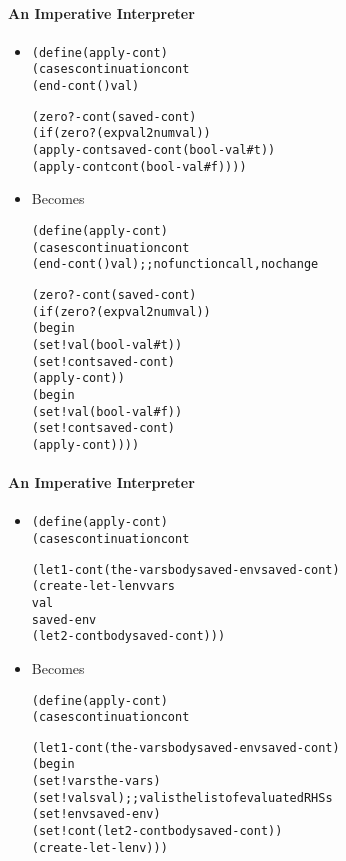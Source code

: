 \documentclass{beamer}
\begin{document}
\begin{frame}[fragile]
\framesubtitle{An Imperative Interpreter}
\begin{scriptsize}
\begin{itemize}
\item<1->
\begin{alltt}
(define (apply-cont)
  (cases continuation cont
    (end-cont () val)

    (zero?-cont (saved-cont)
                (if (zero? (expval2num val))
                    (apply-cont saved-cont (bool-val #t))
                    (apply-cont cont (bool-val #f))))
\end{alltt}

\item<1-> Becomes
\begin{alltt}
(define (apply-cont)
  (cases continuation cont
    (end-cont () val) ;; no function call, no change

    (zero?-cont (saved-cont)
                (if (zero? (expval2num val))
                    (begin
                      (set! val (bool-val #t))
                      (set! cont saved-cont)
                      (apply-cont))
                    (begin
                      (set! val (bool-val #f))
                      (set! cont saved-cont)
                      (apply-cont))))
\end{alltt}

\end{itemize}
\end{scriptsize}
\end{frame}

\begin{frame}[fragile]
\framesubtitle{An Imperative Interpreter}
\begin{scriptsize}
\begin{itemize}
\item<1->
\begin{alltt}
(define (apply-cont)
  (cases continuation cont
    
    (let1-cont (the-vars body saved-env saved-cont)
     (create-let-lenv vars 
                      val 
                      saved-env 
                      (let2-cont body saved-cont)))
\end{alltt}

\item<1-> Becomes
\begin{alltt}
(define (apply-cont)
  (cases continuation cont
    
    (let1-cont (the-vars body saved-env saved-cont)
      (begin
        (set! vars the-vars)
        (set! vals val) ;; val is the list of evaluated RHSs
        (set! env saved-env)
        (set! cont (let2-cont body saved-cont))
        (create-let-lenv)))
\end{alltt}

\end{itemize}
\end{scriptsize}
\end{frame}
\end{document}
